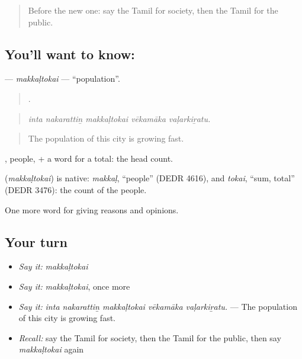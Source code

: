 \label{lesson:TA-C369-makkaltokai}



\begin{quote}
Before the new one: say the Tamil for society, then the Tamil for the public.
\end{quote}

\subsection*{You'll want to know: }
\textbf{} — \emph{makkaḷtokai} — \textquotedblleft{}population\textquotedblright{}.

\begin{quote}
    .
\end{quote}

\begin{quote}
\emph{inta nakarattiṉ makkaḷtokai vēkamāka vaḷarkiṟatu.}
\end{quote}

\begin{quote}
The population of this city is growing fast.
\end{quote}

, people, + a word for a total: the head count.

\begin{cousinweb}
\textbf{} (\emph{makkaḷtokai}) is native: \emph{makkaḷ}, \textquotedblleft{}people\textquotedblright{} (DEDR 4616), and \emph{tokai}, \textquotedblleft{}sum, total\textquotedblright{} (DEDR 3476): the count of the people.
\end{cousinweb}

\begin{grammarlens}[title={What you've built}]
One more word for giving reasons and opinions.
\end{grammarlens}

\subsection*{Your turn}
\begin{itemize}
\raggedright
  \item \emph{Say it:} \emph{makkaḷtokai}
  \item \emph{Say it:} \emph{makkaḷtokai}, once more
  \item \emph{Say it:} \emph{inta nakarattiṉ makkaḷtokai vēkamāka vaḷarkiṟatu.} — The population of this city is growing fast.
  \item \emph{Recall:} say the Tamil for society, then the Tamil for the public, then say \emph{makkaḷtokai} again
\end{itemize}


